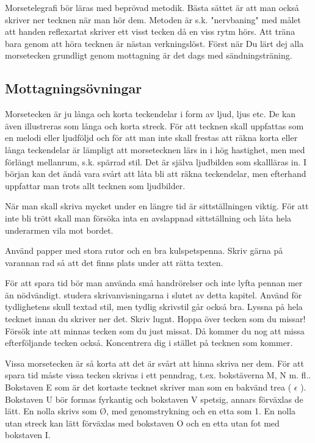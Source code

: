 Morsetelegrafi bör läras med beprövad metodik. Bästa sättet är att man också skriver
ner tecknen när man hör dem. Metoden är s.k. "nervbaning" med målet att handen
reflexartat skriver ett visst tecken då en viss rytm hörs. Att träna bara genom att höra
tecknen är nästan verkningslöst. Först när Du lärt dej alla morsetecken grundligt genom
mottagning är det dags med sändningsträning.

\subsection{Mottagningsövningar}

Morsetecken är ju långa och korta teckendelar i form av ljud, ljus etc. De kan även
illustreras som långa och korta streck. För att tecknen skall uppfattas som en melodi
eller ljudföljd och för att man inte skall frestas att räkna korta eller långa
teckendelar är lämpligt att morsetecknen lärs in i hög hastighet, men med förlängt
mellanrum, s.k. spärrad stil. Det är själva ljudbilden som skallläras in.
I början kan det ändå vara svårt att låta bli att räkna teckendelar, men efterhand
uppfattar man trots allt tecknen som ljudbilder.

När man skall skriva mycket under en längre tid är sittställningen viktig. För att inte
bli trött skall man försöka inta en avslappnad sittställning och låta hela underarmen
vila mot bordet.

Använd papper med stora rutor och en bra kulspetspenna. Skriv gärna på varannan
rad så att det finns plats under att rätta texten.

För att spara tid bör man använda små handrörelser och inte lyfta pennan mer än
nödvändigt. studera skrivanvisningarna i slutet av detta kapitel. Använd för tydlighetens
skull textad stil, men tydlig skrivstil går också bra. Lyssna på hela tecknet innan du
skriver ner det. Skriv lugnt. Hoppa över tecken som du missar! Försök inte att minnas
tecken som du just missat. Då kommer du nog att missa efterföljande tecken också.
Koncentrera dig i stället på tecknen som kommer.

Vissa morsetecken är så korta att det är svårt att hinna skriva ner dem. För att spara
tid måste vissa tecken skrivas i ett penndrag, t.ex. bokstäverna M, N m. fl.. Bokstaven E
som är det kortaste tecknet skriver man som en bakvänd trea ( $\epsilon$ ). Bokstaven U
bör formas fyrkantig och bokstaven V spetsig, annars förväxlas de lätt. En nolla skrivs
som Ø, med genomstrykning och en etta som 1. En nolla utan streck kan lätt förväxlas med
bokstaven O och en etta utan fot med bokstaven I.

